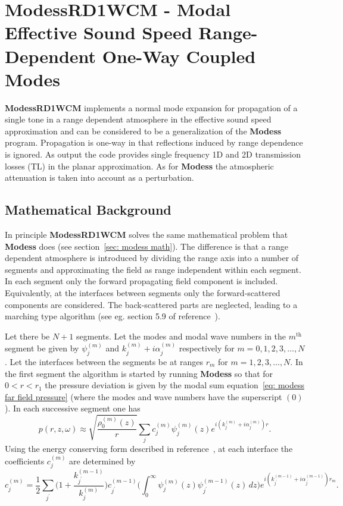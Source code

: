 \section{ModessRD1WCM - Modal Effective Sound Speed \newline Range-Dependent One-Way Coupled Modes}


{\bf ModessRD1WCM} implements a normal mode expansion for propagation of a single tone in a range dependent atmosphere in the effective sound speed approximation and can be considered to be a generalization of the {\bf Modess} program. Propagation is one-way in that reflections induced by range dependence is ignored. As output the code provides single frequency 1D and 2D transmission losses (TL) in the planar approximation. As for {\bf Modess} the atmospheric attenuation is taken into account as a perturbation.

\subsection{Mathematical Background}

In principle {\bf ModessRD1WCM} solves the same mathematical problem that {\bf Modess} does (see section~\ref{sec: modess math}). The difference is that a range dependent atmosphere is introduced by dividing the range axis into a number of segments and approximating the field as range independent within each segment. In each segment only the forward propagating field component is included. Equivalently, at the interfaces between segments only the forward-scattered components are considered. The back-scattered parts are neglected, leading to a marching type algorithm (see eg. section 5.9 of reference~\cite{comp_oc_ac}). 

Let there be $N+1$ segments. Let the modes and modal wave numbers in the $m^\text{th}$ segment be given by $\psi_j^{(m)}$ and $k_j^{(m)}+i\alpha_j^{(m)}$ respectively for $m=0,1,2,3,\dots,N$. Let the interfaces between the segments be at ranges $r_m$ for $m=1,2,3,\dots,N$. In the first segment the algorithm is started by running {\bf Modess} so that for $0<r<r_1$ the pressure deviation is given by the modal sum equation~\ref{eq: modess far field pressure} (where the modes and wave numbers have the superscript $(0)$). In each successive segment one has 
\[
p(r,z,\omega)
\approx
\sqrt{\frac{\rho_0^{(m)}(z)}{r}}\sum_j c_j^{(m)}\psi_j^{(m)}(z) e^{i (k_j^{(m)}+i\alpha_j^{(m)})r}.
\]
Using the energy conserving form described in reference~\cite{comp_oc_ac}, at each interface the coefficients $c_j^{(m)}$ are determined by 
\[
c_j^{(m)}
=
\frac{1}{2}\sum_{j^\prime} \Big(1+\frac{k_{j^\prime}^{(m-1)}}{k_j^{(m)}}\Big) c_{j^\prime}^{(m-1)}\Big(\int_0^\infty \psi_j^{(m)}(z) \psi_{j^\prime}^{(m-1)}(z)\,dz\Big) 
e^{i (k_{j^\prime}^{(m-1)}+i\alpha_{j^\prime}^{(m-1)})r_m}.
\]


